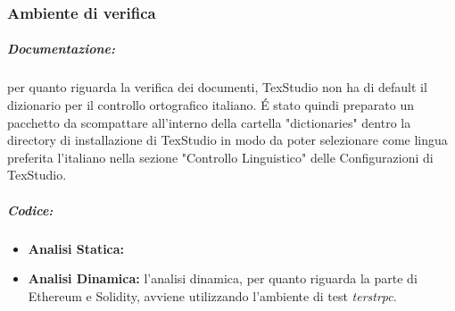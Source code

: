 	\subsubsection{Ambiente di verifica}
	\subparagraph{Documentazione:} per quanto riguarda la verifica dei documenti, TexStudio non
		ha di default il dizionario per il controllo ortografico italiano. \'{E}
		stato quindi preparato un pacchetto da scompattare all'interno della cartella
		"dictionaries" dentro la directory di installazione di TexStudio in modo da
		poter selezionare come lingua preferita l'italiano nella sezione "Controllo
		Linguistico" delle Configurazioni di TexStudio.
	\subparagraph{Codice:}
		\begin{itemize}
			\item \textbf{Analisi Statica:} %
			\item \textbf{Analisi Dinamica:} l'analisi dinamica, per quanto riguarda la parte di Ethereum e Solidity, avviene utilizzando l'ambiente di test \emph{terstrpc}.
		\end{itemize}